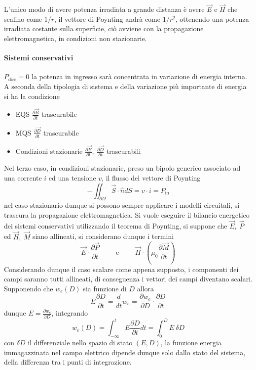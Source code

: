 L'unico modo di avere potenza irradiata a grande distanza è avere $\vec{E}$ e $\vec{H}$ che scalino come $1/r$,
il vettore di Poynting andrà come $1/r^2$, ottenendo una potenza irradiata costante sulla superficie, ciò
avviene con la propagazione elettromagnetica, in condizioni non stazionarie.

\newpage
\paragraph{Sistemi conservativi} $P_\text{diss} = 0$ la potenza in ingresso sarà concentrata in variazione di
energia interna.
A seconda della tipologia di sistema e della variazione più importante di energia si ha la condizione 
\begin{itemize}
\item EQS $\frac{\partial \vec{B}}{\partial t}$ trascurabile
\item MQS $\frac{\partial \vec{D}}{\partial t}$ trascurabile
\item Condizioni stazionarie $\frac{\partial \vec{B}}{\partial t},\ \frac{\partial \vec{D}}{\partial t}$ trascurabili
\end{itemize}
Nel terzo caso, in condizioni stazionarie, preso un bipolo generico associato ad una corrente $i$ ed una tensione $v$, il flusso
del vettore di Poynting
$$
-\iint_{\partial\Omega} \vec{S}\cdot\hat{n}dS = v\cdot i = P_\text{in}
$$
nel caso stazionario dunque si possono sempre applicare i modelli circuitali, si trascura la propagazione 
elettromagnetica.
Si vuole eseguire il bilancio energetico dei sistemi conservativi utilizzando il teorema di Poynting,
si suppone che $\vec{E},\ \vec{P}$ ed $\vec{H},\ \vec{M}$ siano allineati, si considerano dunque i termini
$$
\vec{E}\cdot\frac{\partial \vec{P}}{\partial t}\qquad \text{ e }\qquad \vec{H}\cdot\left(\mu_0\frac{\partial \vec{M}}{\partial t}\right)
$$
Considerando dunque il caso scalare come appena supposto, i componenti dei campi saranno tutti allineati, 
di conseguenza i vettori dei campi diventano scalari. Supponendo che $w_e(D)$ sia funzione di $D$ allora
$$
E\frac{\partial D}{\partial t} = \frac{d}{dt}w_e = \frac{\partial w_e}{\partial D}\cdot \frac{\partial D}{\partial t}
$$
dunque $E = \frac{\partial w_e}{\partial D} $, integrando
$$
w_e(D) = \int_{-\infty}^{t} E\frac{\partial D}{\partial t} dt = \int_0^D E\ \delta D
$$
con $\delta D$ il differenziale nello spazio di stato $(E,D)$, la funzione energia immagazzinata nel campo elettrico
dipende dunque solo dallo stato del sistema, della differenza tra i punti di integrazione.

